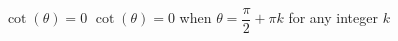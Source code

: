 {$\cot(\theta) = 0$}
{$\cot(\theta) = 0$ when $\theta = \dfrac{\pi}{2} + \pi k$ for any integer $k$}
